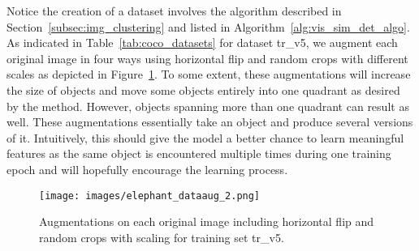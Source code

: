 \documentclass[a4paper,12pt]{report}
\begin{document}
\begin{table}[ht!]
\centering
{}
\caption{COCO training and test datasets used for LORBMS.} \label{tab:coco_datasets}
\end{table}
Notice the creation of a dataset involves the algorithm described in Section~\ref{subsec:img_clustering} and listed in Algorithm~\ref{alg:vis_sim_det_algo}. As indicated in Table~\ref{tab:coco_datasets} for dataset tr\_v5, we augment each original image in four ways using horizontal flip and random crops with different scales as depicted in Figure~\ref{fig:dataaug_elephant}. To some extent, these augmentations will increase the size of objects and move some objects entirely into one quadrant as desired by the method. However, objects spanning more than one quadrant can result as well. These augmentations essentially take an object and produce several versions of it. Intuitively, this should give the model a better chance to learn meaningful features as the same object is encountered multiple times during one training epoch and will hopefully encourage the learning process.
\begin{figure}[ht]
\centering
\texttt{[image: images/elephant\_dataaug\_2.png]}
\caption[Augmentations on each original image.]{Augmentations on each original image including horizontal flip and random crops with scaling for training set tr\_v5.}
\label{fig:dataaug_elephant}
\end{figure}
\end{document}
